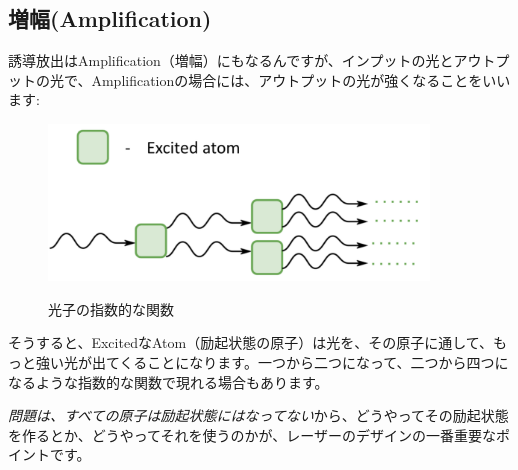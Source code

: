 \subsection{増幅(Amplification)}
誘導放出はAmplification（増幅）にもなるんですが、インプットの光とアウトプットの光で、Amplificationの場合には、アウトプットの光が強くなることをいいます:
\begin{figure}[H]
    \centering
    \includegraphics[width=0.9\textwidth]{lesson5/exponential_photons.pdf}
    \label{図: 1}
    \caption{光子の指数的な関数}
\end{figure}
そうすると、ExcitedなAtom（励起状態の原子）は光を、その原子に通して、もっと強い光が出てくることになります。一つから二つになって、二つから四つになるような指数的な関数で現れる場合もあります。

\textit{問題は、すべての原子は励起状態にはなってない}から、どうやってその励起状態を作るとか、どうやってそれを使うのかが、レーザーのデザインの一番重要なポイントです。
